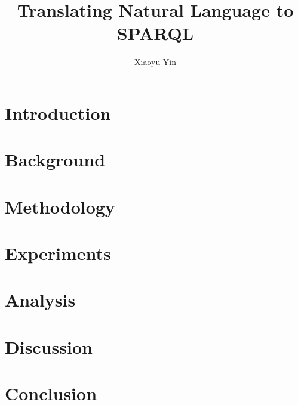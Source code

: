 \documentclass[hyperref, lof, lot, noproblem, masterofscience]{cgvpub}
\author{Xiaoyu Yin}
\title{Translating Natural Language to SPARQL}
\begin{document}
\chapter{Introduction} \label{chapter:introduction}




\chapter{Background} \label{chapter:background}





\chapter{Methodology} \label{chapter:methodology}




\chapter{Experiments} \label{chapter:experiments}




\chapter{Analysis} \label{chapter:analysis}




\chapter{Discussion} \label{chapter:discussion}




\chapter{Conclusion} \label{chapter:conclusion}


\end{document}
